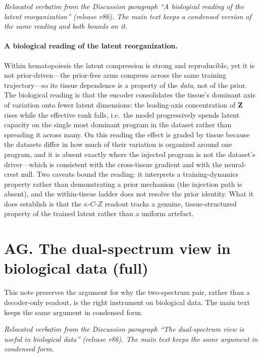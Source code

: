 \documentclass[11 pt,a4 paper]{article}
\begin{document}
\noindent\emph{Relocated verbatim from the Discussion paragraph ``A biological reading of the latent reorganization'' (release r86). The main text keeps a condensed version of the same reading and both bounds on it.}

\paragraph*{A biological reading of the latent reorganization.}
Within hematopoiesis the latent compression is strong and reproducible, yet it is not prior-driven---the prior-free arms compress across the same training trajectory---so its tissue dependence is a property of the \emph{data}, not of the prior. The biological reading is that the encoder consolidates the tissue's dominant axis of variation onto fewer latent dimensions: the leading-axis concentration of $\mathbf{Z}$ rises while the effective rank falls, i.e.\ the model progressively spends latent capacity on the single most dominant program in the dataset rather than spreading it across many. On this reading the effect is graded by tissue because the datasets differ in how much of their variation is organized around one program, and it is absent exactly where the injected program is not the dataset's driver---which is consistent with the cross-tissue gradient and with the neural-crest null. Two caveats bound the reading: it interprets a training-dynamics property rather than demonstrating a prior mechanism (the injection path is absent), and the within-tissue ladder does not resolve the prior identity. What it does establish is that the $\kappa$-$C$-$Z$ readout tracks a genuine, tissue-structured property of the trained latent rather than a uniform artefact.

\clearpage

\section*{AG. The dual-spectrum view in biological data (full)}

This note preserves the argument for why the two-spectrum pair, rather than a decoder-only
readout, is the right instrument on biological data. The main text keeps the same argument in
condensed form.

\noindent\emph{Relocated verbatim from the Discussion paragraph ``The dual-spectrum view is useful in biological data'' (release r86). The main text keeps the same argument in condensed form.}
\end{document}
